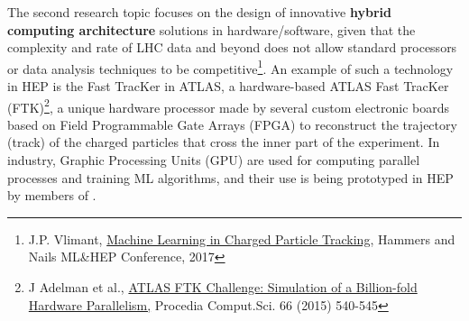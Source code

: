 The second research topic focuses on the design of innovative \textbf{hybrid computing architecture} solutions in hardware/software, given that the complexity and rate of LHC data and beyond does not allow standard processors or data analysis techniques to be competitive\footnote{J.P. Vlimant, \href{https://erez.weizmann.ac.il/pls/htmldb/f?p=101:58:::NO:RP:P58_CODE,P58_FILE:5393,Y}{Machine Learning in Charged Particle Tracking}, Hammers and Nails ML\&HEP Conference, 2017}. An example of such a technology in HEP is the Fast TracKer in ATLAS, a hardware-based ATLAS Fast TracKer (FTK)\footnote{J Adelman et al., \href{https://inspirehep.net/record/1614024/}{ATLAS FTK Challenge: Simulation of a Billion-fold Hardware Parallelism,} Procedia Comput.Sci. 66 (2015) 540-545}, a unique hardware processor made by several custom electronic boards based on Field Programmable Gate Arrays (FPGA) to reconstruct the trajectory (track) of the charged particles that cross the inner part of the experiment. In industry, Graphic Processing Units (GPU) are used for computing parallel processes and training ML algorithms, and their use is being prototyped in HEP by members of \acronym. 
\begin{center}
\vskip-15pt
\end{center}

